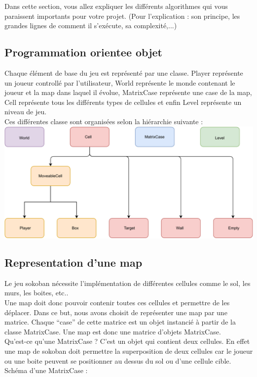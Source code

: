 \documentclass[../main.tex]{subfiles}
\begin{document}
Dans cette section, vous allez expliquer les différents algorithmes qui vous paraissent importants pour votre projet. (Pour l'explication : son principe, les grandes lignes de comment il s'exécute, sa complexité,...)

\subsection{Programmation orientee objet}
Chaque élément de base du jeu est représenté par une classe. Player représente un joueur controllé par l'utilisateur, World représente le monde contenant le joueur et la map dans laquel il évolue, MatrixCase représente une case de la map, Cell représente tous les différents types de cellules et enfin Level représente un niveau de jeu.\\
Ces différentes classe sont organisées selon la hiérarchie suivante :\\

\includegraphics[width=1\textwidth,clip]{images/objects.pdf}

\subsection{Representation d'une map}
Le jeu sokoban nécessite l'implémentation de différentes cellules comme le sol, les murs, les boites, etc.. \\
Une map doit donc pouvoir contenir toutes ces cellules et permettre de les déplacer. Dans ce but, nous avons choisit de représenter une map
par une matrice. Chaque ``case'' de cette matrice est un objet instancié à partir de la classe MatrixCase. Une map est donc une matrice d'objets MatrixCase.\\
Qu'est-ce qu'une MatrixCase ? C'est un objet qui contient deux cellules. En effet une map de sokoban doit permettre la superposition de deux cellules car le joueur ou une boite peuvent se positionner au dessus du sol ou d'une cellule cible.
Schéma d'une MatrixCase :\\
\end{document}

